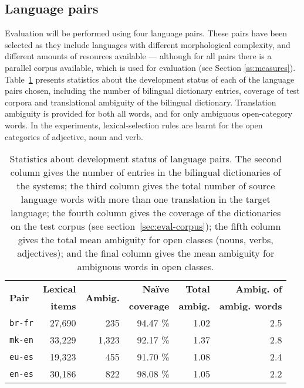 \documentclass[11pt]{article}
\begin{document}
\subsection{Language pairs}
\label{sec:eval-systems}

Evaluation will be performed using four language pairs. These pairs
have been selected as they include languages with different
morphological complexity, and different amounts of resources available
--- although for all pairs there is a parallel corpus available, which
is used for evaluation (see Section \ref{ss:measures}). Table~\ref{table:lang-pair-stats} 
presents statistics about the development status of each of the language 
pairs chosen, including the number of bilingual dictionary entries, coverage of
test corpora and translational ambiguity of the bilingual dictionary. Translation
ambiguity is provided for both all words, and for only ambiguous open-category 
words. In the experiments, lexical-selection rules are learnt for the open categories
of adjective, noun and verb.

\begin{table}
  \centering
  \begin{tabular}{|l|r|r|r|r|r|}
    \hline
    \multirow{2}{*}{\textbf{Pair}} & \textbf{Lexical} & \multirow{2}{*}{\textbf{Ambig.}} & \textbf{Na\"{i}ve}& \textbf{Total} & \textbf{Ambig. of}\\\
                          & \textbf{items} &                            & \textbf{coverage} & \textbf{ambig.} & \textbf{ambig. words}\\
    \hline
    \texttt{br-fr} & 27,690 & 235  &  94.47 \%  & 1.02 & 2.5 \\
    \texttt{mk-en} & 33,229 & 1,323 & 92.17 \%  & 1.37 & 2.8 \\
    \texttt{eu-es} & 19,323 & 455 & 91.70 \% & 1.08 & 2.4 \\
    \texttt{en-es} & 30,186 & 822 & 98.08 \% & 1.05 & 2.2 \\
    \hline
  \end{tabular}
  \caption{Statistics about development status of language pairs. The second
    column gives the number of entries in the bilingual dictionaries of the systems;
    the third column gives the total number of source language words with more 
    than one translation in the target language; the fourth column gives the coverage
    of the dictionaries on the test corpus (see section~\ref{sec:eval-corpus}); the fifth
    column gives the total mean ambiguity for open classes (nouns, verbs, adjectives);
    and the final column gives the mean ambiguity for ambiguous words in open classes.}
  \label{table:lang-pair-stats}
\end{table}
\end{document}
